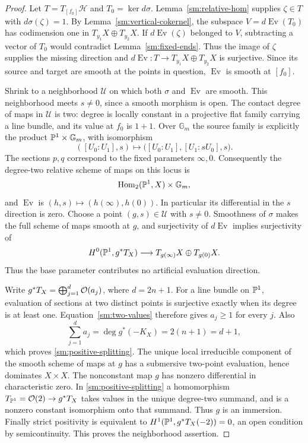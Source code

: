 \begin{proof}
Let $T=T_{[f_0]}\mathscr H$ and $T_0=\ker d\sigma$.
Lemma~\ref{sm:relative-hom} supplies $\zeta\in T$ with
$d\sigma(\zeta)=1$. By Lemma~\ref{sm:vertical-cokernel},
the subspace $V=d\operatorname{Ev}(T_0)$ has codimension one
in $T_{y_1}X\oplus T_{y_2}X$.
If $d\operatorname{Ev}(\zeta)$ belonged to $V$, subtracting
a vector of $T_0$ would contradict Lemma~\ref{sm:fixed-ends}.
Thus the image of $\zeta$ supplies the missing direction and
$d\operatorname{Ev}:T\to T_{y_1}X\oplus T_{y_2}X$ is
surjective. Since its source and target are smooth at the
points in question, $\operatorname{Ev}$ is smooth at $[f_0]$.

Shrink to a neighborhood $\mathscr U$ on which both
$\sigma$ and $\operatorname{Ev}$ are smooth. This neighborhood
meets $s\ne0$, since a smooth morphism is open.
The contact degree of maps in $\mathscr U$ is two: degree is
locally constant in a projective flat family carrying a line
bundle, and its value at $f_0$ is $1+1$.
Over $\mathbb G_m$ the source family is explicitly the product
$\mathbb P^1\times\mathbb G_m$, with isomorphism
\begin{equation}\label{sm:trivialization}
([U_0:U_1],s)\longmapsto
\bigl([U_0:U_1],[U_1:sU_0],s\bigr).
\end{equation}
The sections $p,q$ correspond to the fixed parameters
$\infty,0$. Consequently the degree-two relative scheme of
maps on this locus is
\[
\operatorname{Hom}_2(\mathbb P^1,X)\times\mathbb G_m,
\]
and $\operatorname{Ev}$ is $(h,s)\mapsto(h(\infty),h(0))$.
In particular its differential in the $s$ direction is zero.
Choose a point $(g,s)\in\mathscr U$ with $s\ne0$.
Smoothness of $\sigma$ makes the full scheme of maps smooth
at $g$, and surjectivity of $d\operatorname{Ev}$ implies
surjectivity of
\begin{equation}\label{sm:two-values}
H^0(\mathbb P^1,g^*T_X)
\longrightarrow T_{g(\infty)}X\oplus T_{g(0)}X.
\end{equation}
Thus the base parameter contributes no artificial evaluation
direction.

Write $g^*T_X=\bigoplus_{j=1}^d\mathcal O(a_j)$, where $d=2n+1$.
For a line bundle on $\mathbb P^1$, evaluation of sections at two
distinct points is surjective exactly when its degree is at
least one. Equation~\eqref{sm:two-values} therefore gives
$a_j\geq1$ for every $j$. Also
\[
\sum_{j=1}^d a_j
=\deg g^*(-K_X)=2(n+1)=d+1,
\]
which proves \eqref{sm:positive-splitting}.
The unique local irreducible component of the smooth scheme
of maps at $g$ has a submersive two-point evaluation, hence
dominates $X\times X$. The nonconstant map $g$ has nonzero
differential in characteristic zero. In
\eqref{sm:positive-splitting} a homomorphism
$T_{\mathbb P^1}=\mathcal O(2)\to g^*T_X$ takes values in the unique
degree-two summand, and is a nonzero constant isomorphism
onto that summand. Thus $g$ is an immersion.
Finally strict positivity is equivalent to
$H^1(\mathbb P^1,g^*T_X(-2))=0$, an open condition by
semicontinuity. This proves the neighborhood assertion.
\end{proof}

